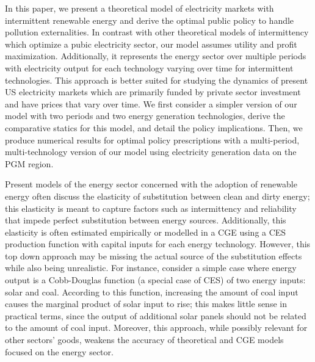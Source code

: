 \documentclass[11pt,a4paper]{extarticle}
\begin{document}
In this paper, we present a theoretical model of electricity markets with intermittent renewable energy and derive the optimal public policy to handle pollution externalities. In contrast with other theoretical models of intermittency which optimize a pubic electricity sector, our model assumes utility and profit maximization. Additionally, it represents the energy sector over multiple periods with electricity output for each technology varying over time for intermittent technologies. This approach is better suited for studying the dynamics of present US electricity markets which are primarily funded by private sector investment and have prices that vary over time. We first consider a simpler version of our model with two periods and two energy generation technologies, derive the comparative statics for this model, and detail the policy implications. Then, we produce numerical results for optimal policy prescriptions with a multi-period, multi-technology version of our model using electricity generation data on the PGM region.

Present models of the energy sector concerned with the adoption of renewable energy often discuss the elasticity of substitution between clean and dirty energy; this elasticity is meant to capture factors such as intermittency and reliability that impede perfect substitution between energy sources. Additionally, this elasticity is often estimated empirically or modelled in a CGE using a CES production function with capital inputs for each energy technology. However, this top down approach may be missing the actual source of the substitution effects while also being unrealistic. For instance, consider a simple case where energy output is a Cobb-Douglas function (a special case of CES) of two energy inputs: solar and coal. According to this function, increasing the amount of coal input causes the marginal product of solar input to rise; this makes little sense in practical terms, since the output of additional solar panels should not be related to the amount of coal input. Moreover, this approach, while possibly relevant for other sectors' goods, weakens the accuracy of theoretical and CGE models focused on the energy sector.
\end{document}

